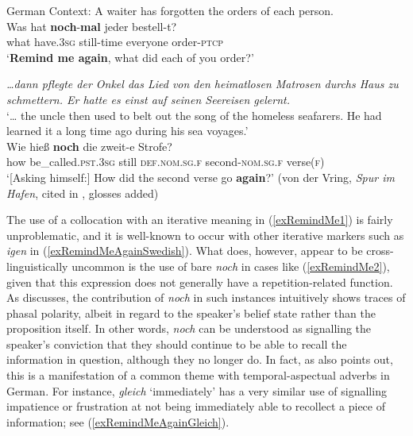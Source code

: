 \begin{exe}
	\ex 
		\begin{xlist}
			\exi{}German
			\ex
		Context: A waiter has forgotten the orders of each person.\label{exRemindMe1}\\
		\gll Was hat \textbf{noch}-\textbf{mal} jeder bestell-t?\\
		what have.3\textsc{sg} still-time everyone order-\textsc{ptcp}\\
		\glt \lq \textbf{Remind me again}, what did each of you order?' \parencite[63]{Sauerland2009}		
		
		\ex\label{exRemindMe2}
			\textit{…dann pflegte der Onkel das Lied von den heimatlosen Matrosen durchs Haus zu schmettern. Er hatte es einst auf seinen Seereisen gelernt.}\\
		\lq … the uncle then used to belt out the song of the homeless seafarers. He had learned it a long time ago during his sea voyages.\rq\\
		\exi{}\gll Wie hieß \textbf{noch} die zweit-e Strofe?\\
		how be\_called.\textsc{pst}.3\textsc{sg} still \textsc{def}.\textsc{nom}.\textsc{sg}.\textsc{f} second-\textsc{nom}.\textsc{sg}.\textsc{f} verse(\textsc{f})\\
		\glt \lq [Asking himself:] How did the second verse go \textbf{again}?\rq{ }(von der Vring, \textit{Spur im Hafen}, cited in \cite[63]{Iwasaki1977}, glosses added) 
	\end{xlist}
\end{exe}

The use of a collocation with an iterative meaning in (\ref{exRemindMe1}) is fairly unproblematic, and it is well-known to occur with other iterative markers such as  \textit{igen} in (\ref{exRemindMeAgainSwedish}). What does, however, appear to be cross-linguistically uncommon is the use of bare \textit{noch} in cases like (\ref{exRemindMe2}), given that this expression does not generally have a repetition-related function. As \textcite{Iwasaki1977} discusses, the contribution of \textit{noch} in such instances intuitively shows traces of phasal polarity, albeit in regard to the speaker's belief state rather than the proposition itself. In other words, \textit{noch} can be understood as signalling the speaker's conviction that they should continue to be able to recall the information in question, although they no longer do. In fact, as \citeauthor{Iwasaki1977} also points out, this is a manifestation of a common theme with temporal-aspectual adverbs in German. For instance, \textit{gleich} \lq immediately\rq{ }has a very similar use of signalling impatience or frustration at not being immediately able to recollect a piece of information; see (\ref{exRemindMeAgainGleich}).

